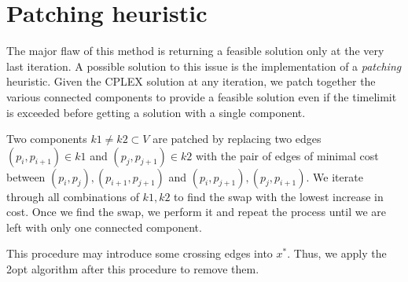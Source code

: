 \section{Patching heuristic}
The major flaw of this method is returning a feasible solution only at the very last iteration. A possible solution to this issue is the implementation of a \textit{patching} heuristic. Given the CPLEX solution at any iteration, we patch together the various connected components to provide a feasible solution even if the timelimit is exceeded before getting a solution with a single component.

Two components $k1\neq k2\subset V$ are patched by replacing two edges $(p_i, p_{i+1})\in k1$ and $(p_j, p_{j+1})\in k2$ with the pair of edges of minimal cost between $(p_i,p_j), (p_{i+1},p_{j+1})$ and $(p_i,p_{j+1}),(p_j, p_{i+1})$. We iterate through all combinations of $k1,k2$ to find the swap with the lowest increase in cost. Once we find the swap, we perform it and repeat the process until we are left with only one connected component.

This procedure may introduce some crossing edges into $x^*$. Thus, we apply the 2opt algorithm after this procedure to remove them.

\newpage
